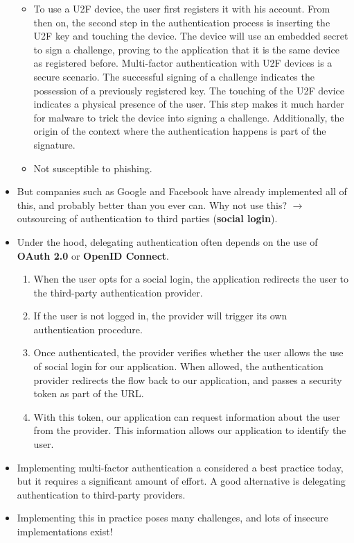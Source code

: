 \documentclass[../main.tex]{subfiles}
\begin{document}
\begin{itemize}
\begin{itemize}
\item To use a U2F device, the user first registers it with his account. From then on, the second step in the authentication process is inserting the U2F key and touching the device. The device will use an embedded secret to sign a challenge, proving to the application that it is the same device as registered before. Multi-factor authentication with U2F devices is a secure scenario. The successful signing of a challenge indicates the possession of a previously registered key. The touching of the U2F device indicates a physical presence of the user. This step makes it much harder for malware to trick the device into signing a challenge. Additionally, the origin of the context where the authentication happens is part of the signature. 
\item Not susceptible to phishing.
\end{itemize}
\item But companies such as Google and Facebook have already implemented all of this, and probably better than you ever can. Why not use this? $\rightarrow$ outsourcing of authentication to third parties (\textbf{social login}).
\item Under the hood, delegating authentication often depends on the use of \textbf{OAuth 2.0} or \textbf{OpenID Connect}.
\begin{enumerate}
\item When the user opts for a social login, the application redirects the user to the third-party authentication provider.
\item If the user is not logged in, the provider will trigger its own authentication procedure.
\item Once authenticated, the provider verifies whether the user allows the use of social login for our application. When allowed, the authentication provider redirects the flow back to our application, and passes a security token as part of the URL.
\item With this token, our application can request information about the user from the provider. This information allows our application to identify the user.
\end{enumerate}
\item Implementing multi-factor authentication a considered a best practice today, but it requires a significant amount of effort. A good alternative is delegating authentication to third-party providers.
\item Implementing this in practice poses many challenges, and lots of insecure implementations exist!
\end{itemize}
\end{document}

